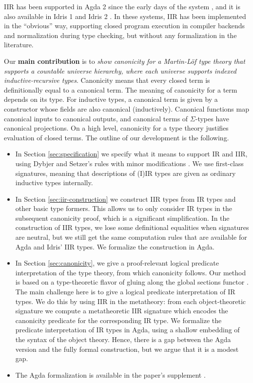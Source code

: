 \documentclass[acmsmall,screen,review]{acmart}
\begin{document}
IIR has been supported in Agda 2 since the early days of the system \cite{DBLP:conf/tphol/BoveDN09},
and it is also available in Idris 1 \cite{DBLP:journals/jfp/Brady13} and Idris 2
\cite{DBLP:conf/ecoop/Brady21}. In these systems, IIR has been implemented in the ``obvious'' way,
supporting closed program execution in compiler backends and normalization during type checking, but
without any formalization in the literature.

Our \textbf{main contribution} is to \emph{show canonicity for a Martin-Löf type theory that
supports a countable universe hierarchy, where each universe supports indexed inductive-recursive
types}. Canonicity means that every closed term is definitionally equal to a canonical term. The
meaning of canonicity for a term depends on its type. For inductive types, a canonical term is given
by a constructor whose fields are also canonical (inductively). Canonical functions map canonical
inputs to canonical outputs, and canonical terms of $\Sigma$-types have canonical projections. On a
high level, canonicity for a type theory justifies evaluation of closed terms. The outline of our
development is the following.

\begin{itemize}
\item In Section \ref{sec:specification} we specify what it means to support IR and IIR, using
  Dybjer and Setzer's rules with minor modifications \cite{DBLP:journals/jlp/DybjerS06,DBLP:journals/apal/DybjerS03}. We use
  first-class signatures, meaning that descriptions of (I)IR types are given as ordinary inductive
  types internally.
\item In Section \ref{sec:iir-construction} we construct IIR types from IR types and other basic
  type formers. This allows us to only consider IR types in the subsequent canonicity proof, which
  is a significant simplification. In the construction of IIR types, we lose some definitional
  equalities when signatures are neutral, but we still get the same computation rules that are
  available for Agda and Idris' IIR types. We formalize the construction in Agda.
\item In Section \ref{sec:canonicity}, we give a proof-relevant logical predicate interpretation of
  the type theory, from which canonicity follows. Our method is based on a type-theoretic flavor of
  gluing along the global sections functor \cite{gluing,coquand2018canonicity}. The main challenge
  here is to give a logical predicate interpretation of IR types. We do this by using IIR in the
  metatheory: from each object-theoretic signature we compute a metatheoretic IIR signature which
  encodes the canonicity predicate for the corresponding IR type.  We formalize the predicate
  interpretation of IR types in Agda, using a shallow embedding of the syntax of the object
  theory. Hence, there is a gap between the Agda version and the fully formal construction, but we
  argue that it is a modest gap.
\item
  The Agda formalization is available in the paper's supplement \cite{TODO}.
\end{itemize}
\end{document}

